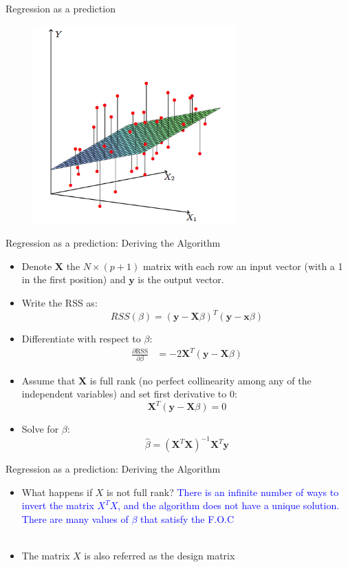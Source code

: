 \documentclass[handout]{beamer}
\begin{document}
\begin{frame}{Regression as a prediction}
	\begin{figure}[htbp]
		\centering
			\includegraphics[height=3in]{ols.png}
		\label{fig:ols}
	\end{figure}
\end{frame}


\begin{frame}{Regression as a prediction: Deriving the Algorithm}
	\begin{itemize}
		\item<+-> Denote $\mathbf{X}$ the $N \times (p + 1)$ matrix with each row an input vector (with a 1 in the first position) and $\mathbf{y}$ is the output vector. 
		\item<+-> Write the RSS as:
		$$RSS(\beta) = (\mathbf{y} - \mathbf{X}\beta)^T (\mathbf{y}-\mathbf{x}\beta)$$
		\item<+-> Differentiate with respect to $\beta$:
		\begin{align}
			\frac{\partial\textrm{RSS}}{\partial \beta} &= -2 \mathbf{X}^T(\mathbf{y}-\mathbf{X}\beta)
		\end{align}
		\item<+-> Assume that $\mathbf{X}$ is full rank (no perfect collinearity among any of the independent variables) and set first derivative to 0:
		$$\mathbf{X}^T(\mathbf{y}-\mathbf{X}\beta)=0$$
		\item<+-> Solve for $\beta$:
		$$\hat \beta = (\mathbf{X}^T \mathbf{X})^{-1} \mathbf{X}^T \mathbf{y}$$
	\end{itemize}
\end{frame}


\begin{frame}{Regression as a prediction: Deriving the Algorithm}
\begin{itemize}
\item<+-> What happens if $X$ is not full rank? \pause 
		\textcolor{blue}{There is an infinite number of ways to invert the matrix $X^TX$, and the algorithm does not have a unique solution. There are many values of $\beta$ that satisfy the F.O.C} \\~\\
\item The matrix $X$ is also referred as the design matrix 
\end{itemize}
\end{frame}
\end{document}
